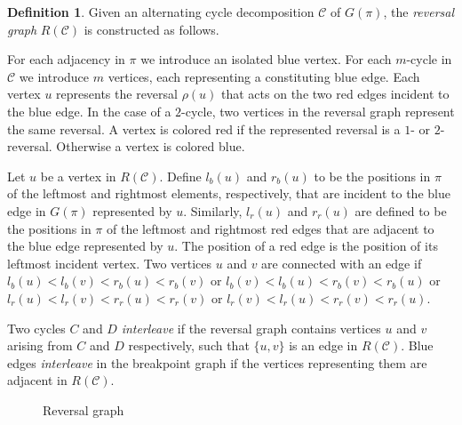 \documentclass[11pt,DIV=11]{scrartcl}
\theoremstyle{definition}
\newtheorem{definition}[theorem]{Definition}
\theoremstyle{remark}
\begin{document}
\begin{definition}
Given an alternating cycle decomposition $\mathcal{C}$ of $G(\pi)$, the \textit{reversal graph} $R(\mathcal{C})$ is constructed as follows.

For each adjacency in $\pi$ we introduce an isolated blue vertex. For each $m$-cycle in $\mathcal{C}$ we introduce $m$ vertices, each representing a constituting blue edge. Each vertex $u$ represents the reversal $\rho(u)$ that acts on the two red edges incident to the blue edge. In the case of a $2$-cycle, two vertices in the reversal graph represent the same reversal. A vertex is colored red if the represented reversal is a $1$- or $2$-reversal. Otherwise a vertex is colored blue.

Let $u$ be a vertex in $R(\mathcal{C})$. Define $l_b(u)$ and $r_b(u)$ to be the positions in $\pi$ of the leftmost and rightmost elements, respectively, that are incident to the blue edge in $G(\pi)$ represented by $u$. Similarly, $l_r(u)$ and $r_r(u)$ are defined to be the positions in $\pi$ of the leftmost and rightmost red edges that are adjacent to the blue edge represented by $u$. The position of a red edge is the position of its leftmost incident vertex. Two vertices $u$ and $v$ are connected with an edge if $l_b(u) < l_b(v) < r_b(u) < r_b(v)$ or $l_b(v) < l_b(u) < r_b(v) < r_b(u)$ or $l_r(u) < l_r(v) < r_r(u) < r_r(v)$ or $l_r(v) < l_r(u) < r_r(v) < r_r(u)$.

Two cycles $C$ and $D$ \textit{interleave} if the reversal graph contains vertices $u$ and $v$ arising from $C$ and $D$ respectively, such that $\{u,v\}$ is an edge in $R(\mathcal{C})$. Blue edges \textit{interleave} in the breakpoint graph if the vertices representing them are adjacent in $R(\mathcal{C})$.
\end{definition}

\begin{figure}
    \centering
    \caption{Reversal graph}
    \label{fig:reversal_graph}
\end{figure}
\end{document}
